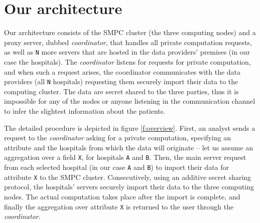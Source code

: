 %
%


\section{Our architecture }\label{s:architecture}
Our architecture consists of the SMPC cluster (the three computing nodes) and a proxy server, dubbed \textit{coordinator}, that handles all private computation requests, as well as \texttt{N} more servers that are hosted in the data providers' premises (in our case the hospitals).
The \textit{coordinator} listens for requests for private computation, and when such a request arises, the coordinator communicates with the data providers (all \texttt{N} hospitals) requesting them securely import their data to the computing cluster.
The data are secret shared to the three parties, thus it is impossible for any of the nodes or anyone listening in the communication channel to infer the slightest information about the patients.



The detailed procedure is depicted in figure \ref{f:overview}.
First, an analyst sends a request to the \textit{coordinator} asking for a private computation, specifying an attribute and the hospitals from which the data will originate -- let us assume an aggregation over a field \texttt{X}, for hospitals \texttt{A} and \texttt{B}.
Then, the main server request from each selected hospital (in our case \texttt{A} and \texttt{B}) to import their data for attribute \texttt{X} to the SMPC cluster.
Consecutively, using an additive secret sharing protocol, the hospitals' servers securely import their data to the three computing nodes.
The actual computation takes place after the import is complete, and finally the aggregation over attribute \texttt{X} is returned to the user through the \textit{coordinator}.




